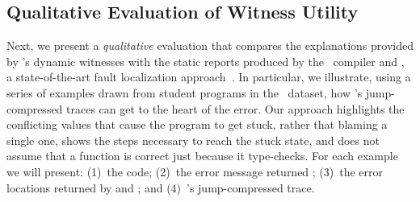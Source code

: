 \subsection{Qualitative Evaluation of Witness Utility}\label{sec:advantage-traces}

Next, we present a \emph{qualitative} evaluation that compares
the explanations provided by \toolname's dynamic witnesses with
the static reports produced by the \ocaml\ compiler and \sherrloc,
a state-of-the-art fault localization approach~\cite{Zhang2014-lv}.
%
In particular, we illustrate, using a series of examples drawn
from student programs in the \ucsdbench\ dataset, how \toolname's
jump-compressed traces can get to the heart of the error. Our approach
%
highlights the conflicting values that cause the program to get
stuck, rather that blaming a single one,
%
shows the steps necessary to reach the stuck state, and
%
does not assume that a function is correct just because it type-checks.
%
For each example we will present:
(1)~the code;
(2)~the error message returned \ocaml;
(3)~the error locations returned by \hlOcaml{\ocaml} and \hlSherrloc{\sherrloc};
and (4)~\toolname's jump-compressed trace.



